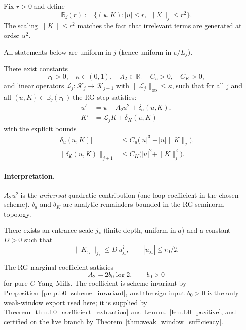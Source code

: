 \begin{definition}\label{def:rg_ball}
Fix $r>0$ and define
\[
\mathbb B_j(r):=\{(u,K): |u|\le r,\ \|K\|_j\le r^2\}.
\]
The scaling $\|K\|\le r^2$ matches the fact that irrelevant terms are generated at order $u^2$.
\end{definition}

All statements below are uniform in $j$ (hence uniform in $a/L_j$).

\begin{proposition}\label{ass:RG_analytic_bounds}
There exist constants
\[
r_0>0,\quad \kappa\in(0,1),\quad A_2\in\mathbb R,\quad C_u>0,\quad C_K>0,
\]
and linear operators $\mathcal L_j:\mathscr K_j\to\mathscr K_{j+1}$ with $\|\mathcal L_j\|_{\mathrm{op}}\le \kappa$,
such that for all $j$ and all $(u,K)\in\mathbb B_j(r_0)$ the RG step satisfies:
\begin{align}
u'&=u+A_2 u^2+\delta_u(u,K),\label{eq:u_update}\\
K'&=\mathcal L_j K+\delta_K(u,K),\label{eq:K_update}
\end{align}
with the explicit bounds
\begin{align}
|\delta_u(u,K)|&\le C_u\big(|u|^3+|u|\|K\|_j\big),\label{eq:du_bound}\\
\|\delta_K(u,K)\|_{j+1}&\le C_K\big(|u|^2+\|K\|_j^2\big).\label{eq:dK_bound}
\end{align}
\end{proposition}

\paragraph{Interpretation.}
$A_2 u^2$ is the \emph{universal} quadratic contribution (one-loop coefficient in the chosen scheme).
$\delta_u$ and $\delta_K$ are analytic remainders bounded in the RG seminorm topology.

\begin{proposition}\label{ass:entrance}
There exists an entrance scale $j_\ast$ (finite depth, uniform in $a$) and a constant $D>0$ such that
\[
\|K_{j_\ast}\|_{j_\ast}\le D\,u_{j_\ast}^2,
\qquad |u_{j_\ast}|\le r_0/2.
\]
\end{proposition}

\begin{proposition}\label{ass:A2_identification}
The RG marginal coefficient satisfies
\[
A_2=2b_0\log 2,
\qquad b_0>0
\]
for pure $G$ Yang--Mills.
The coefficient is scheme invariant by Proposition~\ref{prop:b0_scheme_invariant}, and the sign input $b_0>0$ is the only weak-window export used here; it is supplied by Theorem~\ref{thm:b0_coefficient_extraction} and Lemma~\ref{lem:b0_positive}, and certified on the live branch by Theorem~\ref{thm:weak_window_sufficiency}.
\end{proposition}

